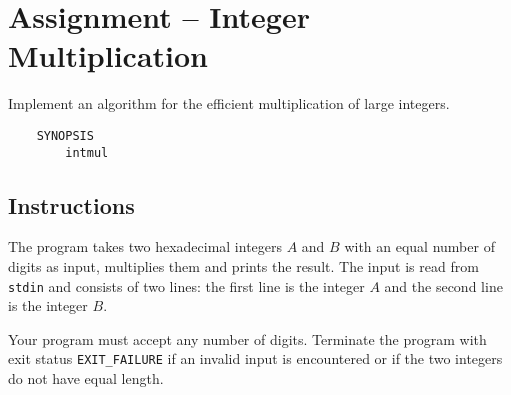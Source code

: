 
\usepackage{amsmath}
\usepackage{multicol}



\section*{Assignment -- Integer Multiplication}
Implement an algorithm for the efficient multiplication of large integers.
\begin{verbatim}
    SYNOPSIS
        intmul
\end{verbatim}

\subsection*{Instructions}
The program takes two hexadecimal integers $A$ and $B$ with an equal number of digits as input, multiplies them and prints the result.
The input is read from \texttt{stdin} and consists of two lines:
the first line is the integer $A$ and the second line is the integer $B$.

Your program must accept any number of digits.
Terminate the program with exit status \verb|EXIT_FAILURE|
if an invalid input is encountered
or if the two integers do not have equal length.

